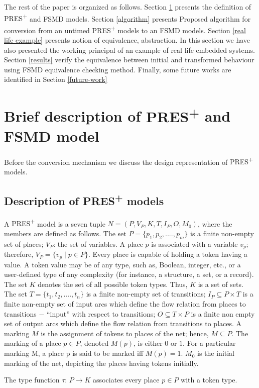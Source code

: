 \documentclass[9pt,executive]{article}
\def\presp{PRES\textsuperscript{+}}
\def\fsmd{FSMD}
\def\presp{PRES\textsuperscript{+}}
\def\fsmd{FSMD}
\begin{document}
  The rest of the paper is organized as follows. 
 Section \ref{description} presents the definition of {\presp} and {\fsmd} models.
 Section \ref{algorithm} presents Proposed algorithm for conversion from an untimed {\presp} models to an {\fsmd} models. 
 Section \ref{real life example}  presents notion of equivalence, abstraction. In this section we have also presented the
 working principal of an example of real life embedded systems.  
 Section \ref{results} verify the equivalence between initial and transformed behaviour using {\fsmd} equivalence checking method. 
 Finally, some future works are identified in Section \ref{future-work}
\section{Brief description of {\presp} and {\fsmd} model}\label{description}
Before the conversion mechanism we discuss the design representation of {\presp} models.
\subsection{ Description of {\presp} models}
  A {\presp} model is a seven tuple $N = (P, V_P, K, T, I_P, O, M_0)$,
where the members are defined as follows. The set $P = \{p_1 , p_2 , ...., p_m\}$
is a finite non-empty set of places; $V_P$: the set of variables. A place $p$ is associated with a variable $v_p$; 
therefore, $V_P = \{ v_p \mid p \in P\}$. Every place is capable of holding a token having a value. 
A token value may be of any type, such as, Boolean, integer, etc., or a user-defined type of any 
complexity (for instance, a structure, a set, or a record). The set $K$ denotes the set of all possible token types. 
Thus, $K$ is a set of sets. The set $T = \{t_1, t_2 , ...., t_n \}$  is a finite non-empty set of transitions; 
$I_P \subseteq P \times T$ is a finite non-empty set of input arcs which define the flow relation from places to 
transitions $-$ ``input'' with respect to transitions; $O \subseteq T \times P$ is a finite non empty set of output arcs 
which define the flow relation from transitions to places. A marking $M$  is the assignment of tokens to places of the net; 
hence, $M \subseteq P$. The marking of a place $p\in P$, denoted $M(p) $, is either  $0$ or $1$. For a particular marking M, 
a place p is said to be marked iff $M(p) = 1$. $M_0$ is the initial marking of the net, depicting the places having tokens initially. 
  
  The type function $\tau$: $P \rightarrow K$ associates every place $p \in P$
with a token type. 
\end{document}
